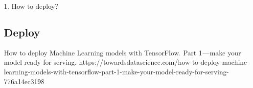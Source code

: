 1. How to deploy?

\subsection{Deploy}

How to deploy Machine Learning models with TensorFlow. Part 1 — make your model ready for serving. https://towardsdatascience.com/how-to-deploy-machine-learning-models-with-tensorflow-part-1-make-your-model-ready-for-serving-776a14ec3198

